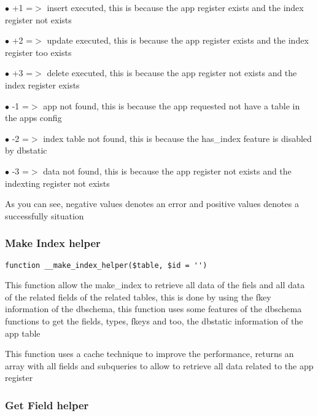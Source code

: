\documentclass[a4paper]{article}
\begin{document}
\begin{compactitem}
\item[\color{myblue}$\bullet$] +1 =$>$ insert executed, this is because the app register exists and the index register not exists
\item[\color{myblue}$\bullet$] +2 =$>$ update executed, this is because the app register exists and the index register too exists
\item[\color{myblue}$\bullet$] +3 =$>$ delete executed, this is because the app register not exists and the index register exists
\item[\color{myblue}$\bullet$] -1 =$>$ app not found, this is because the app requested not have a table in the apps config
\item[\color{myblue}$\bullet$] -2 =$>$ index table not found, this is because the has\_index feature is disabled by dbstatic
\item[\color{myblue}$\bullet$] -3 =$>$ data not found, this is because the app register not exists and the indexting register not exists
\end{compactitem}

As you can see, negative values denotes an error and positive values denotes a successfully situation

\hypertarget{toc483}{}
\subsubsection{Make Index helper}

\begin{lstlisting}
function __make_index_helper($table, $id = '')
\end{lstlisting}

This function allow the make\_index to retrieve all data of the fiels
and all data of the related fields of the related tables, this is done
by using the fkey information of the dbschema, this function uses some
features of the dbschema functions to get the fields, types, fkeys and
too, the dbstatic information of the app table

This function uses a cache technique to improve the performance, returns
an array with all fields and subqueries to allow to retrieve all data
related to the app register

\hypertarget{toc484}{}
\subsubsection{Get Field helper}
\end{document}

